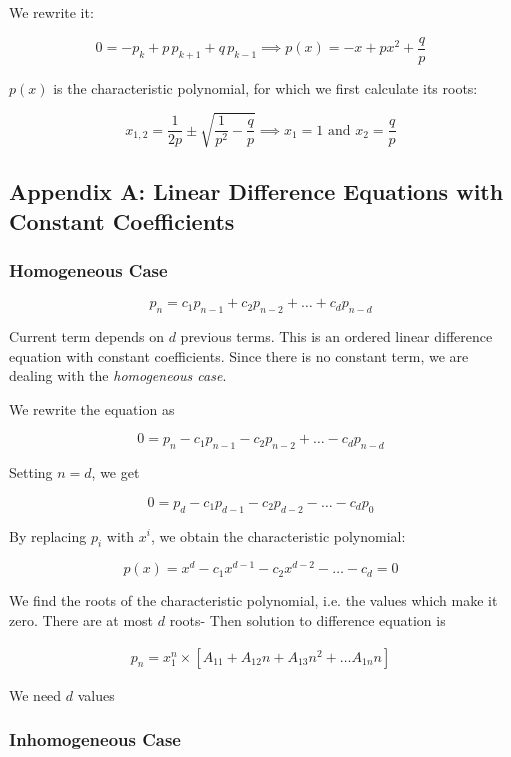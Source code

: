 \documentclass{article}
\theoremstyle{definition}
\begin{document}
We rewrite it:

$$
0 = -p_k + p \, p_{k+1} + q \, p_{k-1} \implies p(x) = -x + px^2 + \frac{q}{p}
$$

$p(x)$ is the characteristic polynomial, for which we first calculate its roots:

$$
x_{1,2} = \frac{1}{2p} \pm \sqrt{\frac{1}{p^2} - \frac{q}{p}} \implies x_1 = 1 \text{ and } x_2 = \frac{q}{p}
$$

\subsection{Appendix A: Linear Difference Equations with Constant Coefficients}

\subsubsection{Homogeneous Case}

$$
p_n = c_1 p_{n-1} + c_2 p_{n-2} + \ldots + c_d p_{n-d}
$$

Current term depends on $d$ previous terms. This is an ordered linear difference equation with constant coefficients. Since there is no constant term, we are dealing with the \emph{homogeneous case}.

We rewrite the equation as

$$
0 = p_n - c_1 p_{n-1} - c_2 p_{n-2} + \ldots - c_d p_{n-d}
$$

Setting $n = d$, we get

$$
0 = p_d - c_1 p_{d-1} - c_2 p_{d-2} - \ldots - c_d p_{0}
$$

By replacing $p_i$ with $x^i$, we obtain the characteristic polynomial:

$$
p(x) = x^d - c_1 x^{d-1} - c_2 x^{d-2} - \ldots - c_d = 0
$$

We find the roots of the characteristic polynomial, i.e. the values which make it zero. There are at most $d$ roots-
Then solution to difference equation is

\begin{align*}
p_n =  x_1^n \times \left[ A_11 + A_12 n + A_13 n^2 + \ldots A_{1n} n \right]
\end{align*}

We need $d$ values

\subsubsection{Inhomogeneous Case}
\end{document}
